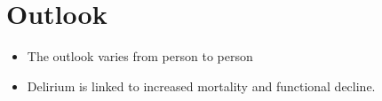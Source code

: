 \section{Outlook}
\begin{itemize}[noitemsep]
  \item The outlook varies from person to person
  \item Delirium is linked to increased mortality and functional decline.
\end{itemize}
